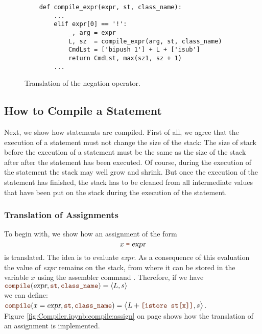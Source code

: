\begin{figure}[!ht]
\centering
\begin{verbatim}
    def compile_expr(expr, st, class_name):
        ...
        elif expr[0] == '!':
            _, arg = expr
            L, sz  = compile_expr(arg, st, class_name)
            CmdLst = ['bipush 1'] + L + ['isub']
            return CmdLst, max(sz1, sz + 1)
        ...
\end{verbatim}
\vspace*{-0.3cm}
\caption{Translation of the negation operator.}
\label{fig:Compiler.ipynb:compile:not}
\end{figure}


\subsection{How to Compile a Statement}
Next, we show how statements are compiled.  First of all, we agree that the execution of a statement
must not change the size of the stack:  The size of stack before the execution of a statement must
be the same as the size of the stack after after the statement has been executed.
Of course, during the execution of the statement the stack may well
grow and shrink.  But once the execution of the statement has finished, the stack has to be cleaned from all
intermediate values that have been put on the stack during the execution of the statement.

\subsubsection{Translation of Assignments}
To begin with, we show how an assignment of the form 
\[ x \;\mytt{=}\; \textsl{expr} \]
is translated.  The idea is to evaluate \textsl{expr}.  As a consequence of this evaluation  the value of
\textsl{expr} remains on the stack, from where it can be stored in the variable $x$ using the assembler command 
. Therefore, if we have
\\[0.2cm]
\hspace*{1.3cm}
$\mytt{compile}(\textsl{expr}, \mytt{st}, \mytt{class\_name}) = \pair(L, s)$
\\[0.2cm]
we can define:
\\[0.2cm]
\hspace*{1.3cm}
$\mytt{compile}(x = \textsl{expr}, \mytt{st}, \mytt{class\_name})
= \bigl\langle L + \mytt{[istore st[x]]}, s \bigr\rangle $.
\\[0.2cm]
Figure \ref{fig:Compiler.ipynb:compile:assign} on page \pageref{fig:Compiler.ipynb:compile:assign} shows how the
translation of an assignment is implemented.


